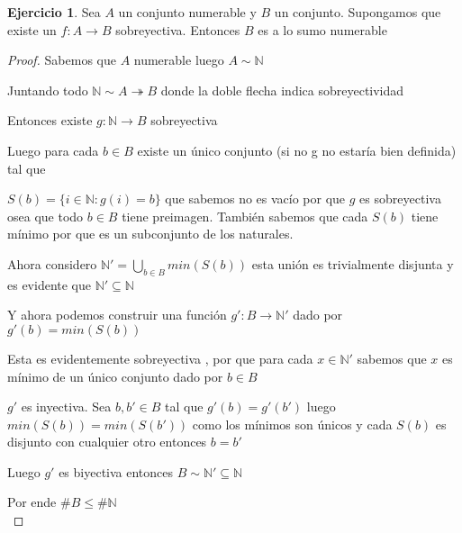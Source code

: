 \documentclass[12pt]{article}
\newcommand{\N}{\mathbb{N}}
\newcommand{\ra}{\rightarrow}
\theoremstyle{definition}
\newtheorem{ej}{Ejercicio}
\begin{document}
\begin{ej}
\noindent
 Sea $A$ un conjunto numerable y $B$ un conjunto. Supongamos que existe un $f:A \ra B$ sobreyectiva. Entonces $B$ es a lo sumo numerable
\begin{proof}
  Sabemos que $A$ numerable luego $A \sim \N$

  Juntando todo $\N \sim A \twoheadrightarrow B$ donde la doble flecha indica sobreyectividad

  Entonces existe $g: \N \ra B$ sobreyectiva

  Luego para cada $b \in B$ existe un único conjunto (si no g no estaría bien definida) tal que 

  $S(b) = \{i \in \N : g(i) = b  \}$ que sabemos no es vacío por que $g$ es sobreyectiva osea que todo $b \in B$ tiene preimagen. También sabemos que cada $S(b)$ tiene mínimo por que es un subconjunto de los naturales.

  Ahora considero $\N' = \bigcup_{b \in B} min (S(b)) $ esta unión es trivialmente disjunta y es evidente que $\N ' \subseteq \N$

  Y ahora podemos construir una función $g': B  \ra \N '$  dado por $g'(b) = min(S(b))$

  Esta es evidentemente sobreyectiva , por que para cada $x \in \N '$ sabemos que $x$ es mínimo de un único conjunto dado por $b \in B$

  $g'$ es inyectiva. Sea $b, b' \in B$ tal que $g'(b) = g'(b')$ luego $min(S(b)) = min(S(b'))$ como los mínimos son únicos y cada $S(b)$ es disjunto con cualquier otro entonces $b = b'$

  Luego $g'$ es biyectiva entonces $B \sim \N ' \subseteq \N$

  Por ende $\# B \leq \# \N$ \\

\end{proof}
\end{ej}
\end{document}
